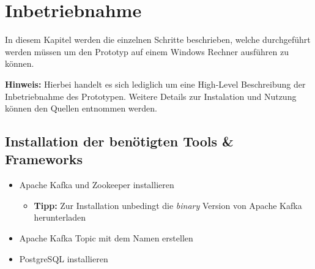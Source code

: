 \chapter{Inbetriebnahme}
\label{chap:betrieb}
In diesem Kapitel werden die einzelnen Schritte beschrieben, welche durchgeführt werden müssen um den Prototyp auf einem Windows Rechner ausführen zu können.

\textbf{Hinweis:}
\newline
Hierbei handelt es sich lediglich um eine High-Level Beschreibung der Inbetriebnahme des Prototypen.
Weitere Details zur Instalation und Nutzung können den Quellen entnommen werden.
\newline

\section{Installation der benötigten Tools \& Frameworks}
\begin{itemize}
  \item Apache Kafka und Zookeeper installieren\autocite{Kafka}
  \begin{itemize}
    \item \textbf{Tipp:} Zur Installation unbedingt die \textit{binary} Version von Apache Kafka herunterladen
  \end{itemize}
  \item Apache Kafka Topic mit dem Namen  erstellen\autocite{KafkaTopic}
  \item PostgreSQL installieren\autocite{PostgreSQL}
\end{itemize}

